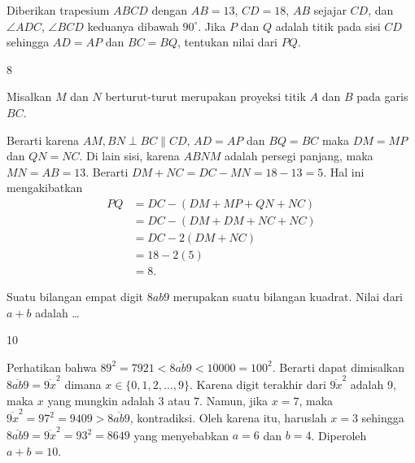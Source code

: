 \documentclass[12pt]{scrartcl}
\begin{document}
\begin{soalbaru}
Diberikan trapesium $ABCD$ dengan $AB = 13$, $CD = 18$, $AB$ sejajar $CD$,
dan $\angle ADC$, $\angle BCD$ keduanya dibawah $90^\circ$. Jika $P$ dan $Q$ adalah titik pada sisi $CD$ sehingga $AD = AP$ dan $BC = BQ$, tentukan nilai dari $PQ$.
\end{soalbaru}
\begin{jawaban}
8
\end{jawaban}
\begin{solusi}
Misalkan $M$ dan $N$ berturut-turut merupakan proyeksi titik $A$ dan $B$ pada garis $BC$. 
\begin{center}
\end{center}
Berarti karena $AM, BN \perp BC \parallel CD$, $AD=AP$ dan $BQ=BC$ maka $DM=MP$ dan $QN=NC$. Di lain sisi, karena $ABNM$ adalah persegi panjang, maka $MN=AB=13$. Berarti $DM+NC=DC-MN=18-13=5$. Hal ini mengakibatkan 
\begin{align*}
PQ &= DC-(DM+MP+QN+NC)\\
&= DC - (DM+DM+NC+NC)\\
&= DC-2(DM+NC)\\
&= 18 - 2(5)\\
&= \boxed{8}.
\end{align*}
\end{solusi}

\begin{soalbaru}
Suatu bilangan empat digit $8ab9$ merupakan suatu bilangan kuadrat. Nilai dari $a+b$ adalah \dots
\end{soalbaru}
\begin{jawaban}
10
\end{jawaban}
\begin{solusi}
Perhatikan bahwa $89^2 = 7921 < \overline{8ab9} < 10000 = 100^2$. Berarti dapat dimisalkan $\overline{8ab9} = \overline{9x}^2$ dimana $x \in \{0,1,2,\dots, 9\}$. Karena digit terakhir dari $\overline{9x}^2$ adalah 9, maka $x$ yang mungkin adalah $3$ atau $7$. Namun, jika $x = 7$, maka $\overline{9x}^2 = 97^2 = 9409 > \overline{8ab9}$, kontradiksi. Oleh karena itu, haruslah $x=3$ sehingga $\overline{8ab9}=\overline{9x}^2 = 93^2 = 8649$ yang menyebabkan $a=6$ dan $b=4$. Diperoleh $a+b = \boxed{10}$.
\end{solusi}
\end{document}
